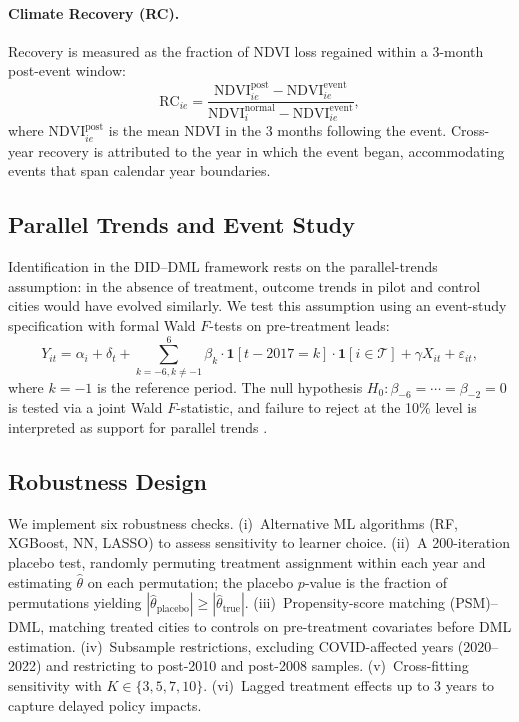 \paragraph{Climate Recovery (RC).}
Recovery is measured as the fraction of NDVI loss regained within a
3-month post-event window:
\begin{equation}
\mathrm{RC}_{ie} = \frac{\mathrm{NDVI}_{ie}^{\mathrm{post}} -
       \mathrm{NDVI}_{ie}^{\mathrm{event}}}
      {\mathrm{NDVI}_{i}^{\mathrm{normal}} -
       \mathrm{NDVI}_{ie}^{\mathrm{event}}},
\end{equation}
where $\mathrm{NDVI}_{ie}^{\mathrm{post}}$ is the mean NDVI in the
3 months following the event. Cross-year recovery is attributed to the
year in which the event began, accommodating events that span calendar
year boundaries.

\subsection{Parallel Trends and Event Study}

Identification in the DID--DML framework rests on the parallel-trends
assumption: in the absence of treatment, outcome trends in pilot and
control cities would have evolved similarly. We test this assumption
using an event-study specification with formal Wald $F$-tests on
pre-treatment leads:
\begin{equation}
\label{eq:event_study}
Y_{it} = \alpha_i + \delta_t + \sum_{k=-6, k\neq -1}^{6}
         \beta_k \cdot \mathbf{1}[t - 2017 = k] \cdot
         \mathbf{1}[i \in \mathcal{T}] + \gamma X_{it} + \varepsilon_{it},
\end{equation}
where $k = -1$ is the reference period. The null hypothesis
$H_0: \beta_{-6} = \cdots = \beta_{-2} = 0$ is tested via a joint
Wald $F$-statistic, and failure to reject at the 10\% level is
interpreted as support for parallel trends
\citep{rambachan2023more}.

\subsection{Robustness Design}

We implement six robustness checks. (i)~Alternative ML algorithms
(RF, XGBoost, NN, LASSO) to assess sensitivity to learner choice.
(ii)~A 200-iteration placebo test, randomly permuting treatment
assignment within each year and estimating $\hat{\theta}$ on each
permutation; the placebo $p$-value is the fraction of permutations
yielding $|\hat{\theta}_{\mathrm{placebo}}| \geq
|\hat{\theta}_{\mathrm{true}}|$. (iii)~Propensity-score matching
(PSM)--DML, matching treated cities to controls on pre-treatment
covariates before DML estimation. (iv)~Subsample restrictions,
excluding COVID-affected years (2020--2022) and restricting to
post-2010 and post-2008 samples. (v)~Cross-fitting sensitivity with
$K \in \{3, 5, 7, 10\}$. (vi)~Lagged treatment effects up to 3 years
to capture delayed policy impacts.
